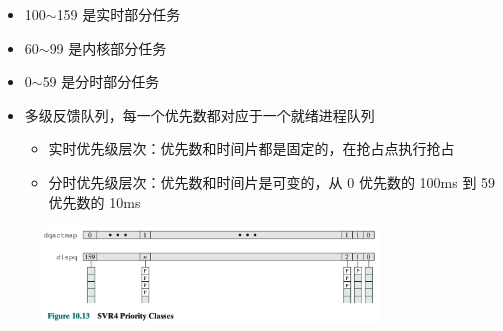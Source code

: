 \documentclass[cs4size,a4paper,10pt]{ctexart}
\begin{document}
	\begin{itemize}
		\item 100$\sim$159 是实时部分任务
		\item 60$\sim$99 是内核部分任务
		\item 0$\sim$59 是分时部分任务
		\item 多级反馈队列，每一个优先数都对应于一个就绪进程队列
		\begin{itemize}
			\item 实时优先级层次：优先数和时间片都是固定的，在抢占点执行抢占
			\item 分时优先级层次：优先数和时间片是可变的，从 0 优先数的 100ms 到 59 优先数的 10ms
		\end{itemize}
	\end{itemize}

	\begin{figure}[H]
		\centering
		\includegraphics[width=0.8\textwidth]{img/2.5.6.2}
	\end{figure}
\end{document}
